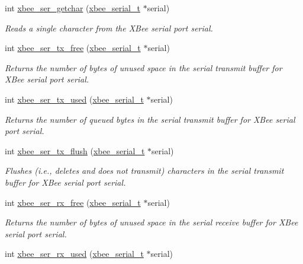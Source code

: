 \begin{DoxyCompactItemize}
int \hyperlink{group__hal__dos_gaeeb38154313a44f86146cdcfe08e7d08}{xbee\-\_\-ser\-\_\-getchar} (\hyperlink{structxbee__serial__t}{xbee\-\_\-serial\-\_\-t} $\ast$serial)
\begin{DoxyCompactList}\small\item\em Reads a single character from the X\-Bee serial port {\itshape serial}. \end{DoxyCompactList}\item 
int \hyperlink{group__hal__dos_ga3ad8f378b572d6fec982f1086bd3b94f}{xbee\-\_\-ser\-\_\-tx\-\_\-free} (\hyperlink{structxbee__serial__t}{xbee\-\_\-serial\-\_\-t} $\ast$serial)
\begin{DoxyCompactList}\small\item\em Returns the number of bytes of unused space in the serial transmit buffer for X\-Bee serial port {\itshape serial}. \end{DoxyCompactList}\item 
int \hyperlink{group__hal__dos_gaabf70934d186354cde4ac14ed27d1bd2}{xbee\-\_\-ser\-\_\-tx\-\_\-used} (\hyperlink{structxbee__serial__t}{xbee\-\_\-serial\-\_\-t} $\ast$serial)
\begin{DoxyCompactList}\small\item\em Returns the number of queued bytes in the serial transmit buffer for X\-Bee serial port {\itshape serial}. \end{DoxyCompactList}\item 
int \hyperlink{group__hal__dos_ga05308d37301d27715f1e1308b7189220}{xbee\-\_\-ser\-\_\-tx\-\_\-flush} (\hyperlink{structxbee__serial__t}{xbee\-\_\-serial\-\_\-t} $\ast$serial)
\begin{DoxyCompactList}\small\item\em Flushes (i.\-e., deletes and does not transmit) characters in the serial transmit buffer for X\-Bee serial port {\itshape serial}. \end{DoxyCompactList}\item 
int \hyperlink{group__hal__dos_ga16fb431a1e66861439518e562431821f}{xbee\-\_\-ser\-\_\-rx\-\_\-free} (\hyperlink{structxbee__serial__t}{xbee\-\_\-serial\-\_\-t} $\ast$serial)
\begin{DoxyCompactList}\small\item\em Returns the number of bytes of unused space in the serial receive buffer for X\-Bee serial port {\itshape serial}. \end{DoxyCompactList}\item 
int \hyperlink{group__hal__dos_ga43b8322771cc16b4130fa5330ad2242b}{xbee\-\_\-ser\-\_\-rx\-\_\-used} (\hyperlink{structxbee__serial__t}{xbee\-\_\-serial\-\_\-t} $\ast$serial)

\end{DoxyCompactItemize}
